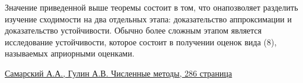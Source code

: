 Значение приведенной выше теоремы состоит в том, что онапозволяет разделить изучение сходимости на два отдельных этапа: доказательство аппроксимации и доказательство устойчивости.
Обычно более сложным этапом является исследование устойчивости, которое состоит в получении оценок вида (8), называемых
априорными оценками.





\bigbreak
\href{http://samarskii.ru/books/book1989.pdf}{Самарский А.А., Гулин А.В. Численные методы, 286 страница}